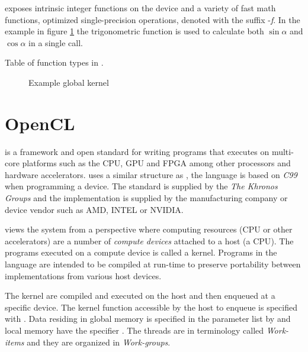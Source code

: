 {\CU} exposes intrinsic integer functions on the device and a variety of fast math functions, optimized single-precision operations, denoted with the suffix -\emph{f}. In the {\CU} example in figure \ref{lst:sample:global:cu} the trigonometric function  is used to calculate both $\sin{\alpha}$ and $\cos{\alpha}$ in a single call.

\begin{table}
	\centering
	
	\caption{Table of function types in {\CU}.}
	\label{tab:cuda:func-types}
\end{table}

\begin{figure}
	\centering
	\fbox{}
	\caption{Example {\CU} global kernel}
	\label{lst:sample:global:cu}	
\end{figure}

\section{OpenCL}

{\OCL} is a framework and open standard for writing programs that executes on multi-core platforms such as the \gls{CPU}, \gls{GPU} and \gls{FPGA} among other processors and hardware accelerators. {\OCL} uses a similar structure as {\CU}, the language is based on \emph{C99} when programming a device. The standard is supplied by the \emph{The Khronos Groups} and the implementation is supplied by the manufacturing company or device vendor such as AMD, INTEL or NVIDIA.

{\OCL} views the system from a perspective where computing resources (\gls{CPU} or other accelerators) are a number of \emph{compute devices} attached to a host (a \gls{CPU}). The programs executed on a compute device is called a kernel. Programs in the {\OCL} language are intended to be compiled at run-time to preserve portability between implementations from various host devices.

The {\OCL} kernel are compiled and executed on the host and then enqueued at a specific device. The kernel function accessible by the host to enqueue is specified with . Data residing in global memory is specified in the parameter list by  and local memory have the specifier . The {\CU} threads are in {\OCL} terminology called \emph{Work-items} and they are organized in \emph{Work-groups}.

